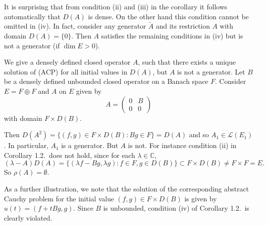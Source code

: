 \begin{remark}\label{rem:1.3}
It is surprising that from condition (ii) and (iii) in the corollary it follows automatically that $D(A)$ is dense.
On the other hand this condition cannot be omitted in (iv).
In fact, consider any generator $\tilde{A}$ and its restriction $A$ with domain $D(A) = \{0\}$.
Then $A$ satisfies the remaining conditions in (iv) but is not a generator (if $\dim E > 0$).
\end{remark}

\begin{example}\label{ex:1.4}
We give a densely defined closed operator $A$, such that there exists a unique solution of (ACP) for all initial values in $D(A)$, but $A$ is not a generator.
Let $B$ be a densely defined unbounded closed operator on a Banach space $F$.
Consider $E = F \oplus F$ and $A$ on $E$ given by
\[
A = \begin{pmatrix} 0 & B \\ 0 & 0 \end{pmatrix}
\]
with domain $F \times D(B)$.

Then $D(A^{2}) = \{(f,g) \in F \times D(B) : Bg \in F\} = D(A)$ and so $A_{1} \in \mathcal{L}(E_{1})$.
In particular, $A_{1}$ is a generator.
But $A$ is not.
For instance condition (ii) in Corollary 1.2.\ does not hold, since for each $\lambda \in \mathbb{C}$,
\[
(\lambda-A)D(A) = \{(\lambda f-Bg,\lambda g) : f \in F, g \in D(B)\} \subset F \times D(B) \neq F \times F = E.
\]
So $\rho(A) = \emptyset$.
\end{example}

As a further illustration, we note that the solution of the corresponding abstract Cauchy problem for the initial value $(f,g) \in F \times D(B)$ is given by $u(t) = (f + tBg,g)$.
Since $B$ is unbounded, condition (iv) of Corollary 1.2.\ is clearly violated.
